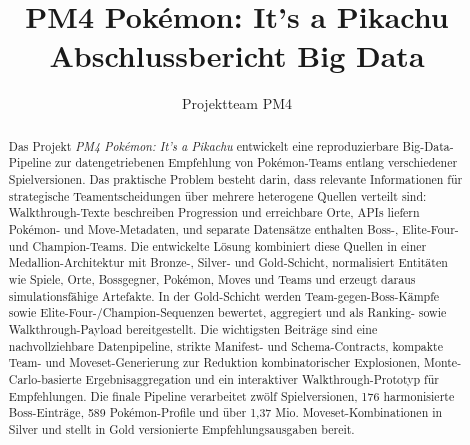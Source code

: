 \documentclass[sigconf,nonacm]{acmart}
\title[PM4 Pokémon Big Data]{PM4 Pokémon: It's a Pikachu\\Abschlussbericht Big Data}
\author{Projektteam PM4}
\affiliation{%
  \institution{Big-Data-Projekt}
  \country{Schweiz}
}
\begin{document}
\begin{abstract}
Das Projekt \emph{PM4 Pokémon: It's a Pikachu} entwickelt eine reproduzierbare Big-Data-Pipeline zur datengetriebenen Empfehlung von Pokémon-Teams entlang verschiedener Spielversionen. Das praktische Problem besteht darin, dass relevante Informationen für strategische Teamentscheidungen über mehrere heterogene Quellen verteilt sind: Walkthrough-Texte beschreiben Progression und erreichbare Orte, APIs liefern Pokémon- und Move-Metadaten, und separate Datensätze enthalten Boss-, Elite-Four- und Champion-Teams. Die entwickelte Lösung kombiniert diese Quellen in einer Medallion-Architektur mit Bronze-, Silver- und Gold-Schicht, normalisiert Entitäten wie Spiele, Orte, Bossgegner, Pokémon, Moves und Teams und erzeugt daraus simulationsfähige Artefakte. In der Gold-Schicht werden Team-gegen-Boss-Kämpfe sowie Elite-Four-/Champion-Sequenzen bewertet, aggregiert und als Ranking- sowie Walkthrough-Payload bereitgestellt. Die wichtigsten Beiträge sind eine nachvollziehbare Datenpipeline, strikte Manifest- und Schema-Contracts, kompakte Team- und Moveset-Generierung zur Reduktion kombinatorischer Explosionen, Monte-Carlo-basierte Ergebnisaggregation und ein interaktiver Walkthrough-Prototyp für Empfehlungen. Die finale Pipeline verarbeitet zwölf Spielversionen, 176 harmonisierte Boss-Einträge, 589 Pokémon-Profile und über 1,37 Mio. Moveset-Kombinationen in Silver und stellt in Gold versionierte Empfehlungsausgaben bereit.
\end{abstract}

\maketitle
\end{document}

